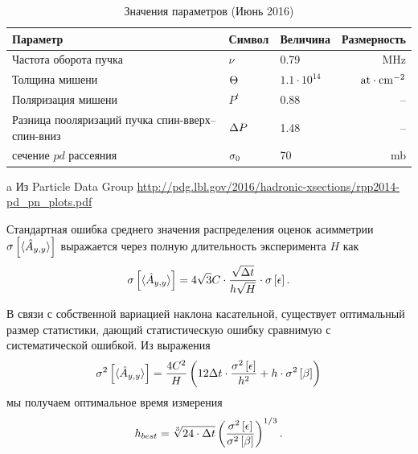 \documentclass{article}
\begin{document}
	\begin{table}[h]
		\centering
		\caption{Значения параметров (Июнь 2016)\label{tbl:Param}}
		\begin{threeparttable}[h]
			\begin{tabular}{p{4.5cm}llr}
				\hline\hline
				Параметр                                         & Символ            & Величина           &             Размерность \\ \hline
				Частота оборота пучка                            & $\nu$             & 0.79               &                     MHz \\
				Толщина мишени                                   & $\Thick$          & $1.1\cdot 10^{14}$ & $\mathrm{at\cdot cm^{-2}}$ \\
				Поляризация мишени                               & $P^t$             & 0.88               &                      -- \\
				Разница пооляризаций пучка спин-вверх--спин-вниз & $\Delta P$             & 1.48               &                      -- \\
				сечение $pd$ рассеяния                           & $\CS[0]$\tnote{a} & 70                 &                      mb \\ \hline
			\end{tabular}
			\begin{tablenotes}
				\item[a]{Из Particle Data Group \url{http://pdg.lbl.gov/2016/hadronic-xsections/rpp2014-pd_pn_plots.pdf}}
			\end{tablenotes}
		\end{threeparttable}
	\end{table}
	
	Стандартная ошибка среднего значения распределения оценок асимметрии $\SE{\avg{\Ayy*}}$ выражается через полную длительность эксперимента $H$ как
	\begin{equation}\label{eq:AvgAyySEPhys}
	\SE{\avg{\Ayy*}} = 4\sqrt{3}C\cdot \frac{\sqrt{\Tint}}{h\sqrt{H}}\cdot\SE{\err}.
	\end{equation}
	
	В связи с собственной вариацией наклона касательной, существует оптимальный размер статистики, дающий статистическую ошибку сравнимую с систематической ошибкой. Из выражения
	\begin{equation}
		\v{\avg{\Ayy*}}	= \frac{4 C^2}{H}\bkt{12\Tint\cdot\frac{\v{\err}}{h^2} + h\cdot\v{\slp}}
	\end{equation}
	мы получаем оптимальное время измерения
	\begin{equation}
	h_{best} = \sqrt[3]{24\cdot \Tint} \bkt{\frac{\v{\err}}{\v{\slp}}}^{1/3}.
	\end{equation}
	
\end{document}
